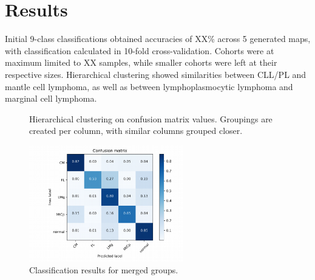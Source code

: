 \documentclass[11pt,a4paper]{article}
\begin{document}
\section{Results}

Initial 9-class classifications obtained accuracies of XX\% across 5 generated maps, with classification calculated in 10-fold cross-validation. Cohorts were at maximum limited to XX samples, while smaller cohorts were left at their respective sizes.
Hierarchical clustering showed similarities between CLL/PL and mantle cell lymphoma, as well as between lymphoplasmocytic lymphoma and marginal cell lymphoma.


\begin{figure}
   \centering
   \caption{Hierarchical clustering on confusion matrix values. Groupings are created per column, with similar columns grouped closer.}
\end{figure}



\begin{figure}
   \centering
   \includegraphics[width=0.6\textwidth]{classification}
   \caption{Classification results for merged groups.}
\end{figure}
\end{document}
